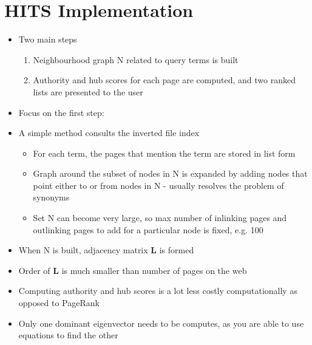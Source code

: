 \documentclass[11pt]{report}
\begin{document}
\section{HITS Implementation}
\begin{itemize}
\item Two main steps
\begin{enumerate}
\item Neighbourhood graph N related to query terms is built
\item Authority and hub scores for each page are computed, and two ranked lists are presented to the user
\end{enumerate}
\item Focus on the first step:
\item A simple method consults the inverted file index 
\begin{itemize}
\item For each term, the pages that mention the term are stored in list form
\item Graph around the subset of nodes in N is expanded by adding nodes that point either to or from nodes in N - usually resolves the problem of synonyms 
\item Set N can become very large, so max number of inlinking pages and outlinking pages to add for a particular node is fixed, e.g. 100
\end{itemize}
\item When N is built, adjacency matrix \textbf{L} is formed
\item Order of \textbf{L} is much smaller than number of pages on the web
\item Computing authority and hub scores is a lot less costly computationally as opposed to PageRank
\item Only one dominant  eigenvector needs to be computes, as you are able to use equations to find the other
\end{itemize}
\end{document}
